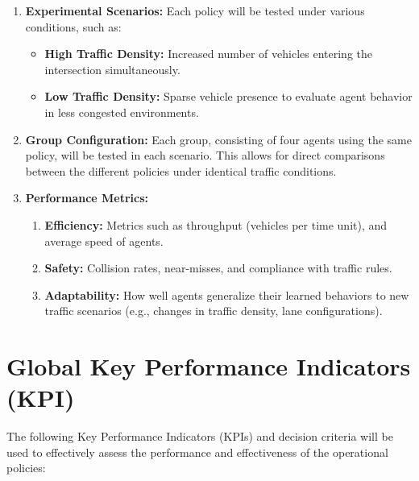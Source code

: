 \begin{enumerate}
    \item \textbf{Experimental Scenarios:} Each policy will be tested under various conditions, such as:
    \begin{itemize}
        \item \textbf{High Traffic Density:} Increased number of vehicles entering the intersection simultaneously.
        \item \textbf{Low Traffic Density:} Sparse vehicle presence to evaluate agent behavior in less congested environments.
    \end{itemize}
    \item \textbf{Group Configuration:} Each group, consisting of four agents using the same policy, will be tested in each scenario. This allows for direct comparisons between the different policies under identical traffic conditions.
    \item \textbf{Performance Metrics:}
    \begin{enumerate}
        \item \textbf{Efficiency:} Metrics such as throughput (vehicles per time unit), and average speed of agents.
        \item \textbf{Safety:} Collision rates, near-misses, and compliance with traffic rules.
        \item \textbf{Adaptability:} How well agents generalize their learned behaviors to new traffic scenarios (e.g., changes in traffic density, lane configurations).
    \end{enumerate}
\end{enumerate}


\section{Global Key Performance Indicators (KPI)}

The following Key Performance Indicators (KPIs) and decision criteria will be used to effectively assess the performance and effectiveness of the operational policies:

